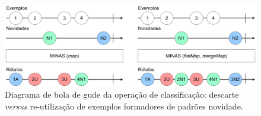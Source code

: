 \begin{figure}[htb]
  \centerline{
    \includegraphics[width=\linewidth,page=1]{figures/map-vs-flatmap.png}
  }
  \caption{Diagrama de bola de gude da operação de classificação: descarte
  \emph{versus} re-utilização de exemplos formadores de padrões novidade.}
  \label{fig:marble}
\end{figure}











